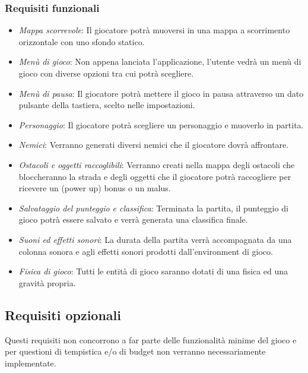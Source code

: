 \subsubsection{Requisiti funzionali}

\begin{itemize}
	\item \textsf{\small \emph{Mappa scorrevole}: Il giocatore potrà muoversi in una mappa a scorrimento orizzontale con uno sfondo statico.}
	\item \textsf{\small \emph{Menù di gioco}: Non appena lanciata l'applicazione, l'utente vedrà un menù di gioco con diverse opzioni tra cui potrà scegliere.}
	\item \textsf{\small \emph{Menù di pausa}: Il giocatore potrà mettere il gioco in pausa attraverso un dato pulsante della tastiera, scelto nelle impostazioni.}
	\item \textsf{\small \emph{Personaggio}: Il giocatore potrà scegliere un personaggio e muoverlo in partita.}
	\item \textsf{\small \emph{Nemici}: Verranno generati diversi nemici che il giocatore dovrà affrontare.}
	\item \textsf{\small \emph{Ostacoli e oggetti raccoglibili}: Verranno creati nella mappa degli ostacoli che bloccheranno la strada e degli oggetti che il giocatore potrà raccogliere per ricevere un (power up) bonus o un malus.}
	\item \textsf{\small \emph{Salvataggio del punteggio e classifica}: Terminata la partita, il punteggio di gioco potrà essere salvato e verrà generata una classifica finale.}
	\item \textsf{\small \emph{Suoni ed effetti sonori}: La durata della partita verrà accompagnata da una colonna sonora e agli effetti sonori prodotti dall'environment di gioco.}
	\item \textsf{\small \emph{Fisica di gioco}: Tutti le entità di gioco saranno dotati di una fisica ed una gravità propria.}
\end{itemize}

\subsection{Requisiti opzionali}

\textsf{\small Questi requisiti non concorrono a far parte delle funzionalità minime del gioco e per questioni di tempistica e/o di budget non verranno necessariamente implementate.}\\

